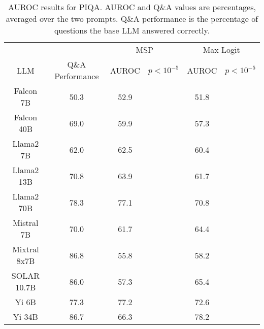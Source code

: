 \begin{table*}
\centering
\begin{tabular}{c|c|c|c|c|c}
& & \multicolumn{2}{c|}{MSP} & \multicolumn{2}{c}{Max Logit} \\ 
LLM & Q\&A Performance & AUROC & $p < 10^{-5}$ & AUROC & $p < 10^{-5}$\\ \hline
Falcon 7B & 50.3 & 52.9 &  & 51.8 & \\
Falcon 40B & 69.0 & 59.9 &  & 57.3 & \\
Llama2 7B & 62.0 & 62.5 &  & 60.4 & \\
Llama2 13B & 70.8 & 63.9 &  & 61.7 & \\
Llama2 70B & 78.3 & 77.1 &  & 70.8 & \\
Mistral 7B & 70.0 & 61.7 &  & 64.4 & \\
Mixtral 8x7B & 86.8 & 55.8 &  & 58.2 & \\
SOLAR 10.7B & 86.0 & 57.3 &  & 65.4 & \\
Yi 6B & 77.3 & 77.2 &  & 72.6 & \\
Yi 34B & 86.7 & 66.3 &  & 78.2 & \\
\hline
\end{tabular}
\caption{AUROC results for PIQA. AUROC and Q\&A values are percentages, averaged over the two prompts. Q\&A performance is the percentage of questions the base LLM answered correctly.}
\label{tab:piqa_auroc}
\end{table*}
